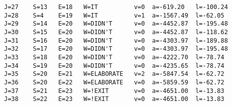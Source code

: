 \begin{verbatim}
J=27    S=13   E=18   W=IT          v=0  a=-619.20   l=-100.24
J=28    S=4    E=19   W=IT          v=1  a=-1567.49  l=-62.05 
J=29    S=14   E=20   W=DIDN'T      v=0  a=-4452.87  l=-195.48
J=30    S=15   E=20   W=DIDN'T      v=0  a=-4452.87  l=-118.62
J=31    S=16   E=20   W=DIDN'T      v=0  a=-4303.97  l=-189.88
J=32    S=17   E=20   W=DIDN'T      v=0  a=-4303.97  l=-195.48
J=33    S=18   E=20   W=DIDN'T      v=0  a=-4222.70  l=-78.74 
J=34    S=19   E=20   W=DIDN'T      v=0  a=-4235.65  l=-78.74 
J=35    S=20   E=21   W=ELABORATE   v=2  a=-5847.54  l=-62.72 
J=36    S=20   E=22   W=ELABORATE   v=0  a=-5859.59  l=-62.72 
J=37    S=21   E=23   W=!EXIT       v=0  a=-4651.00  l=-13.83 
J=38    S=22   E=23   W=!EXIT       v=0  a=-4651.00  l=-13.83 

\end{verbatim}



